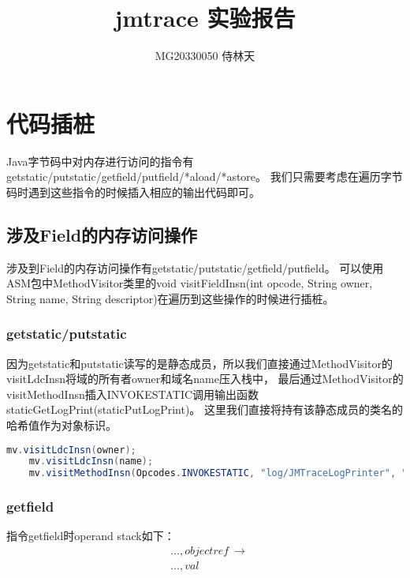 \documentclass[UTF8]{article}
\begin{document}
\title{jmtrace 实验报告}

\author{MG20330050 侍林天}

\maketitle

\section{代码插桩}
Java字节码中对内存进行访问的指令有getstatic/putstatic/getfield/putfield/*aload/*astore。
我们只需要考虑在遍历字节码时遇到这些指令的时候插入相应的输出代码即可。

\subsection{涉及Field的内存访问操作}
涉及到Field的内存访问操作有getstatic/putstatic/getfield/putfield。
可以使用ASM包中MethodVisitor类里的void visitFieldInsn(int opcode, String owner, String name, String descriptor)在遍历到这些操作的时候进行插桩。

\subsubsection{getstatic/putstatic}
因为getstatic和putstatic读写的是静态成员，所以我们直接通过MethodVisitor的visitLdcInsn将域的所有者owner和域名name压入栈中，
最后通过MethodVisitor的visitMethodInsn插入INVOKESTATIC调用输出函数staticGetLogPrint(staticPutLogPrint)。
这里我们直接将持有该静态成员的类名的哈希值作为对象标识。
\begin{lstlisting}[language=Java]
    mv.visitLdcInsn(owner);
    mv.visitLdcInsn(name);
    mv.visitMethodInsn(Opcodes.INVOKESTATIC, "log/JMTraceLogPrinter", "staticGetLogPrint", "(Ljava/lang/String;Ljava/lang/String;)V", false);
\end{lstlisting}

\subsubsection{getfield}
指令getfield时operand stack如下：
\begin{equation*}
    \begin{split}
        &\ldots, objectref\ \rightarrow\\
        &\ldots, val
    \end{split}
\end{equation*}
\end{document}
